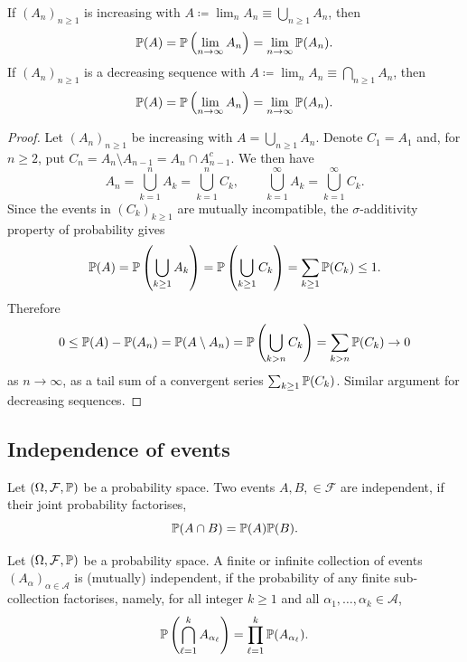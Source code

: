 \documentclass[10pt, a4paper]{article}
\begin{document}
\begin{lemma}
    If $(A_n)_{n \geq 1}$ is increasing with $A \coloneqq \lim_{n}A_n \equiv \bigcup_{n \geq 1}A_n$,
    then
    \[
    \P(A) = \P\left(\lim_{n \to \infty}A_n\right) = \lim_{n \to \infty}\P(A_n).
    \]
    If $(A_n)_{n \geq 1}$ is a decreasing sequence with $A \coloneqq \lim_{n}A_n \equiv \bigcap_{n \geq 1}A_n$,
    then
    \[
    \P(A) = \P\left(\lim_{n \to \infty}A_n\right) = \lim_{n \to \infty}\P(A_n).
    \]

    \begin{proof}
        Let $(A_n)_{n \geq 1}$ be increasing with $A = \bigcup_{n \geq 1}A_n$.
        Denote $C_1 = A_1$ and,
        for $n \geq 2$,
        put $C_n = A_n \setminus A_{n - 1} = A_n \cap A_{n - 1}^{c}$.
        We then have
        \[
        A_n = \bigcup_{k = 1}^{n}A_k = \bigcup_{k = 1}^{n}C_k,\qquad\bigcup_{k = 1}^{\infty}A_k = \bigcup_{k = 1}^{\infty}C_k.
        \]
        Since the events in $(C_k)_{k \geq 1}$ are mutually incompatible,
        the $\sigma$-additivity property of probability gives
        \[
        \P(A) = \P\left(\bigcup_{k \geq 1}A_k\right) = \P\left(\bigcup_{k \geq 1}C_k\right) = \sum_{k \geq 1}\P(C_k) \leq 1.
        \]
        Therefore
        \[
        0 \leq \P(A) - \P(A_n) = \P(A \setminus A_n) = \P\left(\bigcup_{k > n}C_k\right) = \sum_{k > n}\P(C_k) \to 0
        \]
        as $n \to \infty$,
        as a tail sum of a convergent series $\sum_{k \geq 1}\P(C_k)$.
        Similar argument for decreasing sequences.
    \end{proof}
\end{lemma}

\subsection{Independence of events}

\begin{definition}
    Let $(\Omega, \mathcal{F}, \P)$ be a probability space.
    Two events $A, B, \in \mathcal{F}$ are independent,
    if their joint probability factorises,
    \[
    \P(A \cap B) = \P(A)\P(B).
    \]
\end{definition}

\begin{definition}
    Let $(\Omega, \mathcal{F}, \P)$ be a probability space.
    A finite or infinite collection of events $(A_{\alpha})_{\alpha \in \mathcal{A}}$ is
    (mutually)
    independent,
    if the probability of any finite sub-collection factorises,
    namely,
    for all integer $k \geq 1$ and all $\alpha_1, \dotsc, \alpha_k \in \mathcal{A}$,
    \[
    \P\left(\bigcap_{\ell = 1}^{k}A_{\alpha_{\ell}}\right) = \prod_{\ell = 1}^{k}\P(A_{\alpha_{\ell}}).
    \]
\end{definition}
\end{document}
